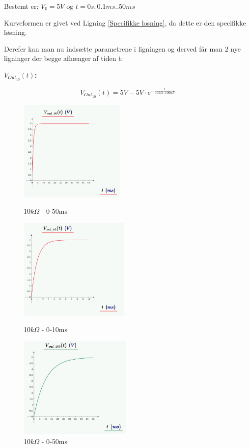 Bestemt er:
$V_{0}=5V$ og $t=0s,0.1ms..50ms$

Kurveformen er givet ved Ligning \ref{Specifikke losning}, da dette er den specifikke løsning.



Derefer kan man nu indsætte parametrene i ligningen og derved får man 2 nye ligninger der begge afhænger af tiden t:

\textbf{$V_{Out_{10}}(t)$:}
\begin{center}
\begin{equation}
V_{Out_{10}}(t) = 5V-5V \cdot e^{-\frac{t}{10k\Omega \cdot 100nF}} 
\label{V_Out_10}
\end{equation}
\end{center}



\begin{figure}
  \begin{minipage}[b]{0.4\textwidth}
   \includegraphics[height=5cm]{M_Fig/V_out_10_1}
\caption{10$k\Omega$ - 0-50ms}
\label{10kOhm50ms}
  \end{minipage}
 
  \begin{minipage}[c]{0.4\textwidth}
 \includegraphics[height=5cm]{M_Fig/V_out_10_2}
\caption{10$k\Omega$ - 0-10ms}
\label{10kOhm10ms}
  \end{minipage}
  
  
   \begin{minipage}[]{0.4\textwidth}
 \includegraphics[height=5cm]{M_Fig/V_out_100_1}
\caption{10$k\Omega$ - 0-50ms}
\label{100kOhm50ms}
  \end{minipage}
\end{figure}
